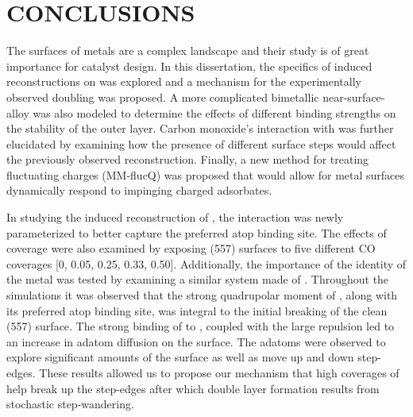 \chapter{CONCLUSIONS}

The surfaces of metals are a complex landscape and their study is of great
importance for catalyst design. In this dissertation, the specifics of 
induced reconstructions on  was explored and a mechanism for the
experimentally observed doubling was proposed. A more complicated bimetallic
 near-surface-alloy was also modeled to determine the effects
of different binding strengths on the stability of the outer  layer.
Carbon monoxide's interaction with  was further elucidated by examining
how the presence of different surface steps would affect the previously
observed reconstruction. Finally, a new method for treating fluctuating charges
(MM-flucQ) was proposed that would allow for metal surfaces dynamically respond
to impinging charged adsorbates.

In studying the induced reconstruction of , the 
interaction was newly parameterized to better capture the preferred atop
binding site. The effects of coverage were also examined by exposing (557)
 surfaces to five different CO coverages [0, 0.05, 0.25, 0.33, 0.50].
Additionally, the importance of the identity of the metal was tested by
examining a similar system made of . Throughout the simulations it was observed that the strong
quadrupolar moment of , along with its preferred atop binding site, was
integral to the initial breaking of the clean (557) surface. The strong binding
of  to , coupled with the large  repulsion led
to an increase in  adatom diffusion on the surface. The adatoms were
observed to explore significant amounts of the surface as well as move up and
down step-edges. These results allowed us to propose our mechanism that high
coverages of  help break up the step-edges after which double layer
formation results from stochastic step-wandering.

